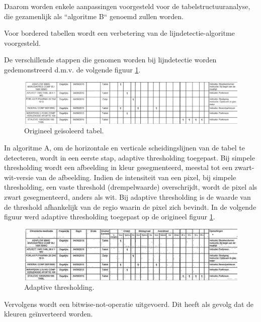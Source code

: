 Daarom worden enkele aanpassingen voorgesteld voor de tabelstructuuranalyse, die gezamenlijk als ``algoritme B`` genoemd zullen worden.

Voor bordered tabellen wordt een verbetering van de lijndetectie-algoritme voorgesteld.

De verschillende stappen die genomen worden bij lijndetectie worden gedemonstreerd d.m.v. de volgende figuur \ref{fig:lijn-detectie-origineel}.

\begin{figure}[H]
    \centering
    \includegraphics[width=1\textwidth]{img/lijn_detectie_origineel.png}
    \caption{Origineel geïsoleerd tabel.}
    \label{fig:lijn-detectie-origineel}
\end{figure}

In algoritme A, om de horizontale en verticale scheidingslijnen van de tabel te detecteren, wordt in een eerste stap, adaptive thresholding toegepast. Bij simpele thresholding wordt een afbeelding in kleur gesegmenteerd, meestal tot een zwart-wit-versie van de afbeelding. Indien de intensiteit van een pixel, bij simpele thresholding, een vaste threshold (drempelwaarde) overschrijdt, wordt de pixel als zwart gesegmenteerd, anders als wit. Bij adaptive thresholding is de waarde van de threshold afhankelijk van de regio waarin de pixel zich bevindt. In de volgende figuur werd adaptive thresholding toegepast op de origineel figuur \ref{fig:lijn-detectie-origineel}.

\begin{figure}[H]
    \centering
    \includegraphics[width=1\textwidth]{img/line_detection_a_1_adaptive_threshold_on_image.png}
    \caption{Adaptive thresholding.}
\end{figure}

Vervolgens wordt een bitwise-not-operatie uitgevoerd. Dit heeft als gevolg dat de kleuren geïnverteerd worden.

